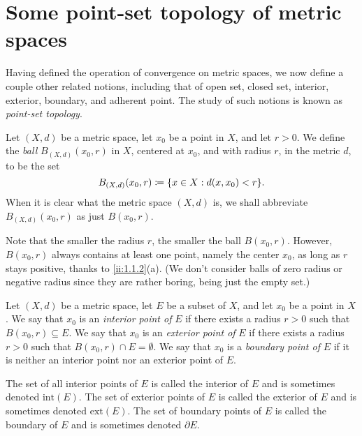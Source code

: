 \section{Some point-set topology of metric spaces}\label{ii:sec:1.2}

\begin{note}
  Having defined the operation of convergence on metric spaces, we now define a couple other related notions, including that of open set, closed set, interior, exterior, boundary, and adherent point.
  The study of such notions is known as \emph{point-set topology}.
\end{note}

\begin{defn}[Balls]\label{ii:1.2.1}
  Let \((X, d)\) be a metric space, let \(x_0\) be a point in \(X\), and let \(r > 0\).
  We define the \emph{ball} \(B_{(X, d)}(x_0, r)\) in \(X\), centered at \(x_0\), and with radius \(r\), in the metric \(d\), to be the set
  \[
    B_{(X, d)}(x_0, r) \coloneqq \set{x \in X : d(x, x_0) < r}.
  \]
  When it is clear what the metric space \((X, d)\) is, we shall abbreviate \(B_{(X, d)}(x_0, r)\) as just \(B(x_0, r)\).
\end{defn}

\setcounter{thm}{3}
\begin{rmk}\label{ii:1.2.4}
  Note that the smaller the radius \(r\), the smaller the ball \(B(x_0 , r)\).
  However, \(B(x_0 , r)\) always contains at least one point, namely the center \(x_0\), as long as \(r\) stays positive, thanks to \cref{ii:1.1.2}(a).
  (We don't consider balls of zero radius or negative radius since they are rather boring, being just the empty set.)
\end{rmk}

\begin{defn}\label{ii:1.2.5}
  Let \((X, d)\) be a metric space, let \(E\) be a subset of \(X\), and let \(x_0\) be a point in \(X\).
  We say that \(x_0\) is an \emph{interior point of} \(E\) if there exists a radius \(r > 0\) such that \(B(x_0, r) \subseteq E\).
  We say that \(x_0\) is an \emph{exterior point of} \(E\) if there exists a radius \(r > 0\) such that \(B(x_0, r) \cap E = \emptyset\).
  We say that \(x_0\) is a \emph{boundary point of} \(E\) if it is neither an interior point nor an exterior point of \(E\).
\end{defn}

\begin{note}
  The set of all interior points of \(E\) is called the interior of \(E\) and is sometimes denoted \(\text{int}(E)\).
  The set of exterior points of \(E\) is called the exterior of \(E\) and is sometimes denoted \(\text{ext}(E)\).
  The set of boundary points of \(E\) is called the boundary of \(E\) and is sometimes denoted \(\partial E\).
\end{note}

